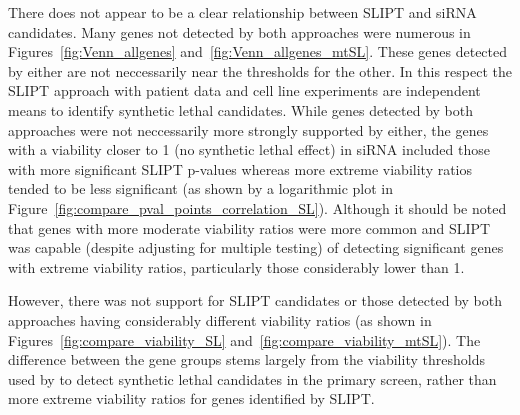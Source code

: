 There does not appear to be a clear relationship between SLIPT and siRNA candidates. Many genes not detected by both approaches were numerous in Figures~\ref{fig:Venn_allgenes} and~\ref{fig:Venn_allgenes_mtSL}. These genes detected by either are not neccessarily near the thresholds for the other. In this respect the SLIPT approach with patient data and cell line experiments are independent means to identify synthetic lethal candidates. While genes detected by both approaches were not neccessarily more strongly supported by either, the genes with a viability closer to 1 (no synthetic lethal effect) in siRNA included those with more significant SLIPT p-values whereas more extreme viability ratios tended to be less significant (as shown by a logarithmic plot in Figure~\ref{fig:compare_pval_points_correlation_SL}). Although it should be noted that genes with more moderate viability ratios were more common and SLIPT was capable (despite adjusting for multiple testing) of detecting significant genes with extreme viability ratios, particularly those considerably lower than 1. 

However, there was not support for SLIPT candidates or those detected by both approaches having considerably different viability ratios (as shown in Figures~\ref{fig:compare_viability_SL} and~\ref{fig:compare_viability_mtSL}). The difference between the gene groups stems largely from the viability thresholds used by \citet{Telford2015} to detect synthetic lethal candidates in the primary screen, rather than more extreme viability ratios for genes identified by SLIPT. 

